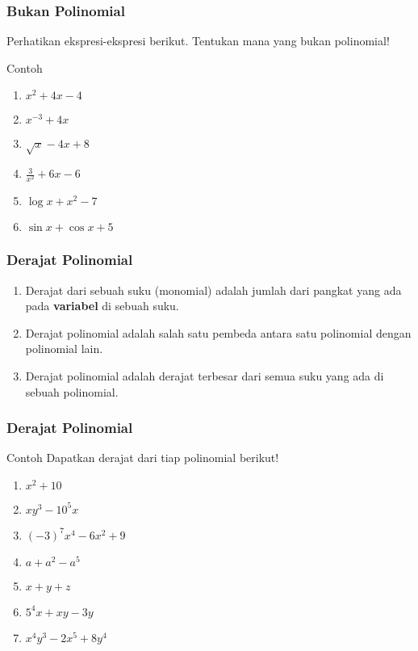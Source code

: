 \documentclass[11pt]{beamer}
\begin{document}
	\begin{frame}
		\frametitle{Bukan Polinomial}
		Perhatikan ekspresi-ekspresi berikut. Tentukan mana yang bukan polinomial!
		\begin{exampleblock}{Contoh}
			\begin{enumerate}
				\item $x^2+4x-4$
				\item $x^{-3}+4x$
				\item $\sqrt{x}-4x+8$
				\item $\frac{3}{x^2}+6x-6$
				\item $\log{x}+x^2-7$
				\item $\sin{x}+\cos{x}+5$
			\end{enumerate}
		\end{exampleblock}
	\end{frame}
	
	\begin{frame}
		\frametitle{Derajat Polinomial}
		\begin{enumerate}
			\item Derajat dari sebuah suku (monomial) adalah jumlah dari pangkat yang ada pada \textbf{variabel} di sebuah suku. 
			\item Derajat polinomial adalah salah satu pembeda antara satu polinomial dengan polinomial lain.
			\item Derajat polinomial adalah derajat terbesar dari semua suku yang ada di sebuah polinomial.

		\end{enumerate}
	\end{frame}
	
	\begin{frame}
		\frametitle{Derajat Polinomial}
		\begin{exampleblock}{Contoh}
			Dapatkan derajat dari tiap polinomial berikut!
			\begin{enumerate}
				\item $x^2+10$
				\item $xy^3-10^5x$
				\item $(-3)^7x^4-6x^2+9$
				\item $a+a^2-a^5$
				\item $x+y+z$
				\item $5^4x+xy-3y$
				\item $x^4y^3-2x^5+8y^4$
			\end{enumerate}
		\end{exampleblock}
	\end{frame}
	
\end{document}
